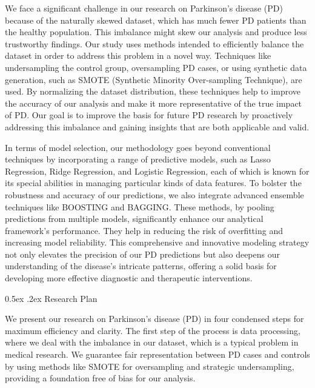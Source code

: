 \documentclass[12pt,]{article}
\makeatletter
\renewcommand\subsection{
  \@startsection{subsection}{2}{\z@}
    {-1.5ex\@plus -1ex \@minus -.2ex}%
    {0.5ex \@plus .2ex}%
    {\normalfont\normalsize\bf}} %
\makeatother
\begin{document}
We face a significant challenge in our research on Parkinson's disease
(PD) because of the naturally skewed dataset, which has much fewer PD
patients than the healthy population. This imbalance might skew our
analysis and produce less trustworthy findings. Our study uses methods
intended to efficiently balance the dataset in order to address this
problem in a novel way. Techniques like undersampling the control group,
oversampling PD cases, or using synthetic data generation, such as SMOTE
(Synthetic Minority Over-sampling Technique), are used. By normalizing
the dataset distribution, these techniques help to improve the accuracy
of our analysis and make it more representative of the true impact of
PD. Our goal is to improve the basis for future PD research by
proactively addressing this imbalance and gaining insights that are both
applicable and valid.

In terms of model selection, our methodology goes beyond conventional
techniques by incorporating a range of predictive models, such as Lasso
Regression, Ridge Regression, and Logistic Regression, each of which is
known for its special abilities in managing particular kinds of data
features. To bolster the robustness and accuracy of our predictions, we
also integrate advanced ensemble techniques like BOOSTING and BAGGING.
These methods, by pooling predictions from multiple models,
significantly enhance our analytical framework's performance. They help
in reducing the risk of overfitting and increasing model reliability.
This comprehensive and innovative modeling strategy not only elevates
the precision of our PD predictions but also deepens our understanding
of the disease's intricate patterns, offering a solid basis for
developing more effective diagnostic and therapeutic interventions.

\hypertarget{research-plan}{%
\subsection{Research Plan}\label{research-plan}}

We present our research on Parkinson's disease (PD) in four condensed
steps for maximum efficiency and clarity. The first step of the process
is data processing, where we deal with the imbalance in our dataset,
which is a typical problem in medical research. We guarantee fair
representation between PD cases and controls by using methods like SMOTE
for oversampling and strategic undersampling, providing a foundation
free of bias for our analysis.
\end{document}

